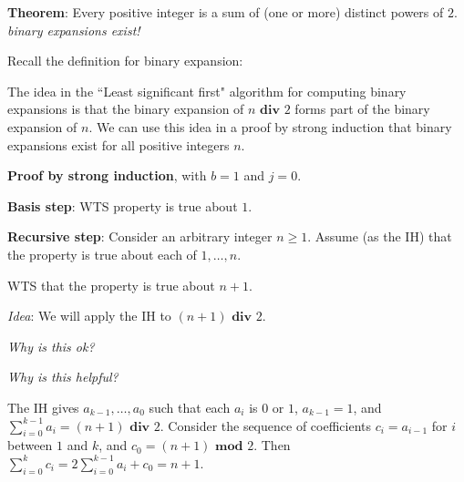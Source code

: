 
{\bf Theorem}: Every positive integer is a sum of (one or more) distinct powers of $2$.
{\it binary expansions exist!}

Recall the definition for binary expansion:




The idea in the ``Least significant first" algorithm 
for computing binary expansions is that the binary
expansion of $n \textbf{ div } 2$ forms part of the binary expansion of $n$. We can use this 
idea in a proof by strong induction that binary expansions exist for all 
positive integers $n$.

\newpage

{\bf Proof by strong induction}, with $b=1$ and $j=0$.


{\bf Basis step}:  WTS property is true about  $1$.

\phantom{Choose $a_0 = 1$, then $(a_0)_2 = 1 \cdot 2^0 = 1$.}

{\bf Recursive step}: Consider an arbitrary integer $n \geq 1$.
Assume (as the IH) that the property is true about  each of $1, \ldots, n$.  

WTS that the property is true about $n+1$.

{\it Idea}: We will apply the IH to $(n+1) \textbf{ div } 2$.

{\it Why is this ok?}



{\it Why is this helpful?}

The IH gives $a_{k-1}, \ldots, a_0$ such that each $a_i$ is $0$ or $1$, $a_{k-1} = 1$, 
and $\sum_{i=0}^{k-1} a_i = (n+1) \textbf{ div } 2$. Consider the sequence of 
coefficients
$c_{i} = a_{i-1}$ for $i$ between $1$ and $k$, and $c_0 = (n+1) \textbf{ mod } 2$.
Then $\sum_{i=0}^k c_i = 2 \sum_{i=0}^{k-1} a_i + c_0 = n+1$.
